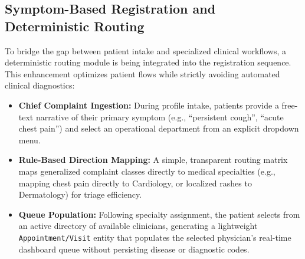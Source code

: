 \documentclass[12pt, a4paper]{report}
\numberwithin{equation}{chapter}
\begin{document}
\subsection{Symptom-Based Registration and Deterministic Routing}
To bridge the gap between patient intake and specialized clinical workflows, a deterministic routing module is being integrated into the registration sequence. This enhancement optimizes patient flows while strictly avoiding automated clinical diagnostics:
\begin{itemize}
    \item \textbf{Chief Complaint Ingestion:} During profile intake, patients provide a free-text narrative of their primary symptom (e.g., ``persistent cough'', ``acute chest pain'') and select an operational department from an explicit dropdown menu.
    \item \textbf{Rule-Based Direction Mapping:} A simple, transparent routing matrix maps generalized complaint classes directly to medical specialties (e.g., mapping chest pain directly to Cardiology, or localized rashes to Dermatology) for triage efficiency.
    \item \textbf{Queue Population:} Following specialty assignment, the patient selects from an active directory of available clinicians, generating a lightweight \texttt{Appointment/Visit} entity that populates the selected physician's real-time dashboard queue without persisting disease or diagnostic codes.
\end{itemize}
\end{document}
